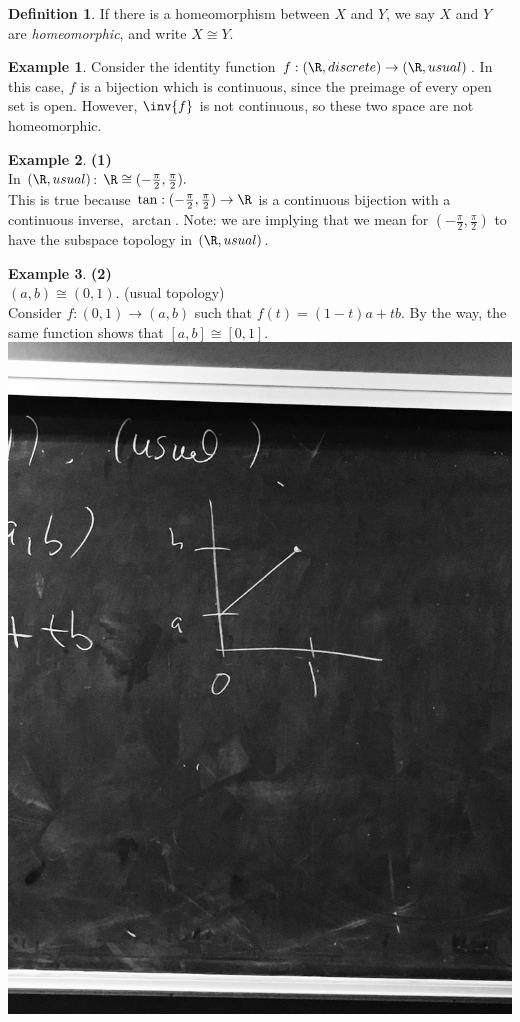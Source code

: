 \documentclass[a5paper]{article}
\theoremstyle{definition}%
\newtheorem*{definition*}{Definition}
\newtheorem*{example*}{Example}
\numberwithin{exercise}{section}
\theoremstyle{remark}%
\begin{document}
\begin{definition*}
If there is a homeomorphism between $X$ and $Y$, we say $X$ and $Y$ are \emph{homeomorphic}, and write $X\cong Y$. 
\end{definition*}

\begin{example*}
Consider the identity function $f:(\R,discrete)\to(\R,usual)$. In this case, $f$ is a bijection which is continuous, since the preimage of every open set is open. However, $\inv{f}$ is not continuous, so these two space are not homeomorphic. 
\end{example*}

\begin{example*}\textbf{(1)}\\
In $(\R,usual)$: $\R\cong (-\frac{\pi}{2},\frac{\pi}{2}).$ \\
This is true because $\tan: (-\frac{\pi}{2},\frac{\pi}{2})\to \R$ is a continuous bijection with a continuous inverse, $\arctan$. Note: we are implying that we mean for $(-\frac{\pi}{2},\frac{\pi}{2})$ to have the subspace topology in $(\R,usual)$. 
\end{example*}

\begin{example*}\textbf{(2)}\\
$(a,b)\cong (0,1)$. (usual topology)\\
Consider $f:(0,1)\to (a,b)$ such that $f(t)=(1-t)a+tb$. By the way, the same function shows that $[a,b]\cong [0,1]$.
\includegraphics[scale=.02]{images/ab_01_homeomorph}
\end{example*}
\end{document}
